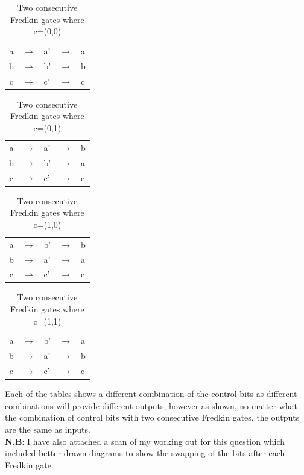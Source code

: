 \documentclass[12pt]{article}
\begin{document}
\begin{enumerate}
        \begin{table}[h!]
            \centering
            \begin{tabular}{cclll}
            a & $\rightarrow$ & a' & $\rightarrow$ & a \\
            b & $\rightarrow$ & b' & $\rightarrow$ & b \\
            c & $\rightarrow$ & c' & $\rightarrow$ & c
            \end{tabular}
            \caption{Two consecutive Fredkin gates where c=(0,0)}
            \label{tab1}
            \end{table}


            \begin{table}[h!]
                \centering
                \begin{tabular}{cclll}
                a & $\rightarrow$ & a' & $\rightarrow$ & b \\
                b & $\rightarrow$ & b' & $\rightarrow$ & a \\
                c & $\rightarrow$ & c' & $\rightarrow$ & c
                \end{tabular}
                \caption{Two consecutive Fredkin gates where c=(0,1)}
                \label{tab1}
                \end{table}
\begin{table}[h!]
\centering
\begin{tabular}{cclll}
a & $\rightarrow$ & b' & $\rightarrow$ & b \\
b & $\rightarrow$ & a' & $\rightarrow$ & a \\
c & $\rightarrow$ & c' & $\rightarrow$ & c
\end{tabular}
\caption{Two consecutive Fredkin gates where c=(1,0)}
\label{tab1}
\end{table}

\begin{table}[h!]
    \centering
    \begin{tabular}{cclll}
    a & $\rightarrow$ & b' & $\rightarrow$ & a \\
    b & $\rightarrow$ & a' & $\rightarrow$ & b \\
    c & $\rightarrow$ & c' & $\rightarrow$ & c
    \end{tabular}
    \caption{Two consecutive Fredkin gates where c=(1,1)}
    \label{tab1}
    \end{table}

Each of the tables shows a different combination of the control bits as different combinations will provide different outputs, however as shown, no matter what the combination of control bits with two consecutive Fredkin gates, the outputs are the same as inputs. 
\\
\textbf{N.B}: I have also attached a scan of my working out for this question which included better drawn diagrams to show the swapping of the bits after each Fredkin gate. 


\end{enumerate}
\end{document}
